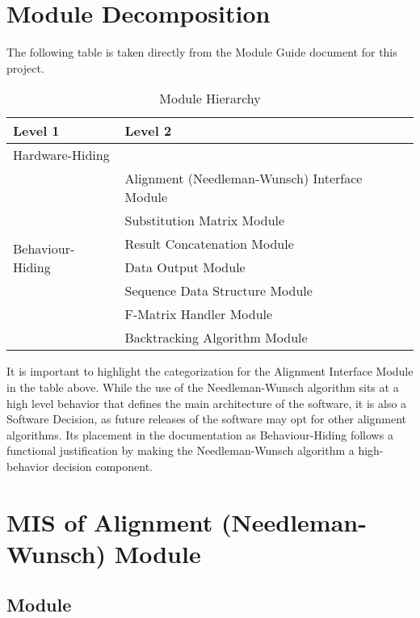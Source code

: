 \documentclass[12pt, titlepage]{article}
\begin{document}
\section{Module Decomposition}

The following table is taken directly from the Module Guide document for this project.

\begin{table}[h!]
\centering
\begin{tabular}{p{} p{}}
\toprule
\textbf{Level 1} & \textbf{Level 2}\\
\midrule

{Hardware-Hiding} & ~ \\
\midrule

\multirow{7}{0.3\textwidth}{Behaviour-Hiding} & Alignment (Needleman-Wunsch) Interface Module\\
& Substitution Matrix Module\\
& Result Concatenation Module\\
& Data Output Module\\
\midrule

\multirow{3}{0.3\textwidth}{Software Decision} & Sequence Data Structure Module\\
& F-Matrix Handler Module\\
& Backtracking Algorithm Module\\
\bottomrule

\end{tabular}
\caption{Module Hierarchy}
\label{TblMH}
\end{table}

\newpage
It is important to highlight the categorization for the Alignment Interface Module in the table above. 
While the use of the Needleman-Wunsch algorithm sits at a high level behavior that defines 
the main architecture of the software, it is also a Software Decision, as future releases of the 
software may opt for other alignment algorithms. Its placement in the documentation as Behaviour-Hiding follows
a functional justification by making the Needleman-Wunsch algorithm a high-behavior decision component.
~\newpage

\section{MIS of Alignment (Needleman-Wunsch) Module} \label{mNW}

\subsection{Module}
\end{document}
